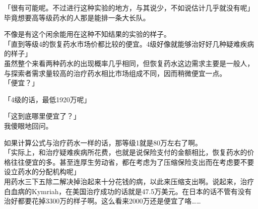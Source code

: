 「很有可能呢。不过进行这种实验的地方，与其说少，不如说估计几乎就没有呢」\\

毕竟想要高等级药水的人那是能排一条大长队。

不像是有这个闲余能用在这种不知结果的实验的样子。\\

「直到等级4的恢复药水市场价都比较的便宜。4级好像就能够治好好几种疑难疾病的样子」\\

虽然整个来看两种药水的出现概率几乎相同，但恢复药水这边需求主要是一般人，与探索者需求量较高的治疗药水相比市场组成不同，因而稍微便宜一点。\\

「便宜？」

「4级的话，最低1920万呢」

「这到底哪里便宜了？」\\

我傻眼地回问。

如果计算公式与治疗药水一样的话，那等级1就是80万左右了啊。\\

「实际上，和治疗疑难疾病所花费，也就是说保险支付的金额相比，恢复药水的价格往往便宜的多。甚至连厚生劳动省，都在考虑为了压缩保险支出而在考虑要不要设立药水的分配机构呢」\\

用药水三下五除二解决掉治起来十分花钱的病，以此来压缩支出啊。说起来，治疗白血病的Kymriah，在美国治疗成功的话就是47.5万美元。在日本的话不管有没有治好都要花掉3300万的样子啊。这么看来2000万还是便宜了咯……\\


